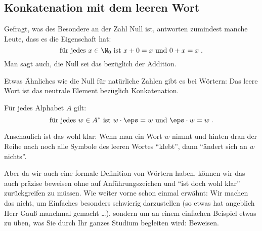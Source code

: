 \Tut\subsection{Konkatenation mit dem leeren Wort}

Gefragt, was des Besondere an der Zahl Null ist, antworten zumindest
manche Leute, dass es die Eigenschaft hat:
\[
  \text{für jedes } x\in \N_0 \text{ ist } x+0 = x \text{ und } 0+x = x \;.
\]
Man sagt auch, die Null sei das  bezüglich der Addition.

Etwas Ähnliches wie die Null für natürliche Zahlen gibt es bei
Wörtern: Das leere Wort ist das neutrale Element bezüglich
Konkatenation.

\begin{lemma}
  Für jedes Alphabet $A$ gilt:
  \[
  \text{für jedes } w\in A^* \text{ ist } w\cdot \eps = w \text{ und } \eps\cdot w =w  \;.
  \]
\end{lemma}
%
Anschaulich ist das wohl klar: Wenn man ein Wort $w$ nimmt und hinten
dran der Reihe nach noch alle Symbole des leeren Wortes "`klebt"',
dann "`ändert sich an $w$ nichts"'.

Aber da wir auch eine formale Definition von Wörtern haben, können wir
das auch präzise beweisen ohne auf Anführungszeichen und "`ist doch
wohl klar"' zurückgreifen zu müssen. Wie weiter vorne schon einmal
erwähnt: Wir machen das nicht, um Einfaches besonders schwierig
darzustellen (so etwas hat angeblich Herr Gauß manchmal gemacht
\dots), sondern um an einem einfachen Beispiel etwas zu üben, was Sie
durch Ihr ganzes Studium begleiten wird: Beweisen.

